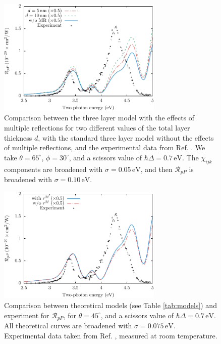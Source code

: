 \begin{figure}
\centering
\includegraphics[width=0.7\textwidth]{content/figures/fig-4_4_12}
\caption{Comparison between the three layer model with the effects of multiple reflections for two different values of the total layer thickness $d$, with the standard three layer model without the effects of multiple reflections, and the experimental data from Ref. \cite{mejiaPRB02}. We take $\theta=65^{\circ}$, $\phi=30^{\circ}$, and a scissors value of $\hbar\Delta = 0.7\,\text{eV}$. The $\chi_{ijk}$ components are broadened with $\sigma=0.05\,\text{eV}$, and then $\mathcal{R}_{pP}$ is broadened with $\sigma=0.10\,\text{eV}$.}
\label{fig:average}
\end{figure}

\begin{figure}
\centering
\includegraphics[width=0.7\textwidth]{content/figures/fig-4_4_13}
\caption{Comparison between theoretical models (see Table
\ref{tab:models}) and experiment for $\mathcal{R}_{pP}$, for
$\theta=45^{\circ}$, and a scissors value of $\hbar\Delta = 0.7\,\text{eV}$.
All theoretical curves are broadened with $\sigma=0.075\,\text{eV}$.
Experimental data taken from Ref. \cite{mitchellSS01}, measured at room
temperature.}
\label{fig:mr2}
\end{figure}

